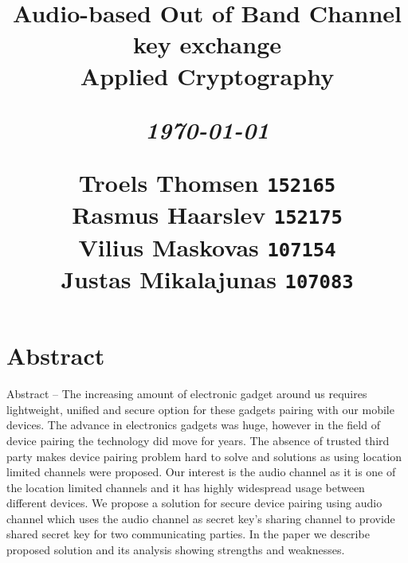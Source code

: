 \documentclass[12pt]{article}
\title{
  \vspace{4cm}
  \begin{flushleft}
  \Large{\textbf{Audio-based Out of Band Channel key exchange}} \\
  \large{Applied Cryptography}
  \end{flushleft}
  \vspace{0cm}
  \begin{flushleft}
  \small
  \textit{\today}
  \end{flushleft}
  \vspace{12cm}
  \begin{flushleft}
  \small
  Troels Thomsen \texttt{152165} \\
  Rasmus Haarslev \texttt{152175} \\
  Vilius Maskovas \texttt{107154} \\
  Justas Mikalajunas \texttt{107083}\\
  \end{flushleft}
}
\date{
}
\begin{document}
\clearpage
{}
\thispagestyle{empty}
\maketitle

\newpage

\tableofcontents

\newpage


\section{Abstract}
\label{sec:Abstract}
Abstract – The increasing amount of electronic gadget around us requires lightweight, unified and secure option for these gadgets pairing with our mobile devices. The advance in electronics gadgets was huge, however in the field of device pairing the technology did move for years. The absence of trusted third party makes device pairing problem hard to solve and solutions as using location limited channels were proposed. Our interest is the audio channel as it is one of the location limited channels and it has highly widespread usage between different devices.
We propose a solution for secure device pairing using audio channel which uses the audio channel as secret key’s sharing channel to provide shared secret key for two communicating parties. In the paper we describe proposed solution and its analysis showing strengths and weaknesses.

\newpage
\end{document}
